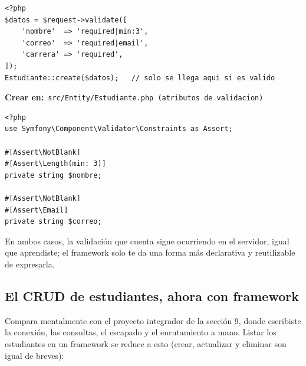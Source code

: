 \documentclass[11pt]{article}
\begin{document}
\begin{cajacodigo}
\begin{lstlisting}[style=php]
<?php
$datos = $request->validate([
    'nombre'  => 'required|min:3',
    'correo'  => 'required|email',
    'carrera' => 'required',
]);
Estudiante::create($datos);   // solo se llega aqui si es valido
\end{lstlisting}
\end{cajacodigo}
\vspace{2pt}
{\small\color{phpazulo}\textbf{Crear en:}~}\texttt{src/\allowbreak{}Entity/\allowbreak{}Estudiante.\allowbreak{}php  (atributos de validacion)}\par\nobreak\vspace{-1pt}
\begin{cajacodigo}
\begin{lstlisting}[style=php]
<?php
use Symfony\Component\Validator\Constraints as Assert;

#[Assert\NotBlank]
#[Assert\Length(min: 3)]
private string $nombre;

#[Assert\NotBlank]
#[Assert\Email]
private string $correo;
\end{lstlisting}
\end{cajacodigo}
\vspace{2pt}
En ambos casos, la validación que cuenta sigue ocurriendo en el servidor, igual que aprendiste; el framework solo te da una forma más declarativa y reutilizable de expresarla.

\subsection{El CRUD de estudiantes, ahora con framework}
Compara mentalmente con el proyecto integrador de la sección 9, donde escribiste la conexión, las consultas, el escapado y el enrutamiento a mano. Listar los estudiantes en un framework se reduce a esto (crear, actualizar y eliminar son igual de breves):
\end{document}
